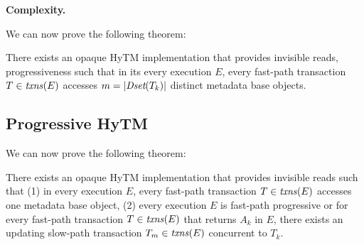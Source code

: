 \vspace{1mm}\noindent\textbf{Complexity.}
%

We can now prove the following theorem:
%
\begin{theorem}
\label{th:inswrite}
There exists an opaque HyTM implementation that provides invisible reads, progressiveness
such that
in its every execution $E$, every fast-path transaction $T\in \ms{txns}(E)$
accesses $m=|\textit{Dset}(T_k)|$ distinct metadata base objects.
\end{theorem}
%
\begin{proofsketch}
%

\end{proofsketch}
%
%
\subsection{Progressive HyTM}
\label{sec:hytm2}
%
We can now prove the following theorem:
%
\begin{theorem}
\label{th:inswrite2}
There exists an opaque HyTM implementation that provides invisible reads
such that (1) in every execution $E$,
every fast-path transaction $T\in \ms{txns}(E)$
accesses one metadata base object,
(2) every execution $E$ is fast-path progressive or for
every fast-path transaction $T\in \ms{txns}(E)$
that returns $A_k$ in $E$, there exists an updating slow-path transaction $T_m \in \ms{txns}(E)$
concurrent to $T_k$.
\end{theorem}
%
\begin{proofsketch}
% 
\end{proofsketch}
%

